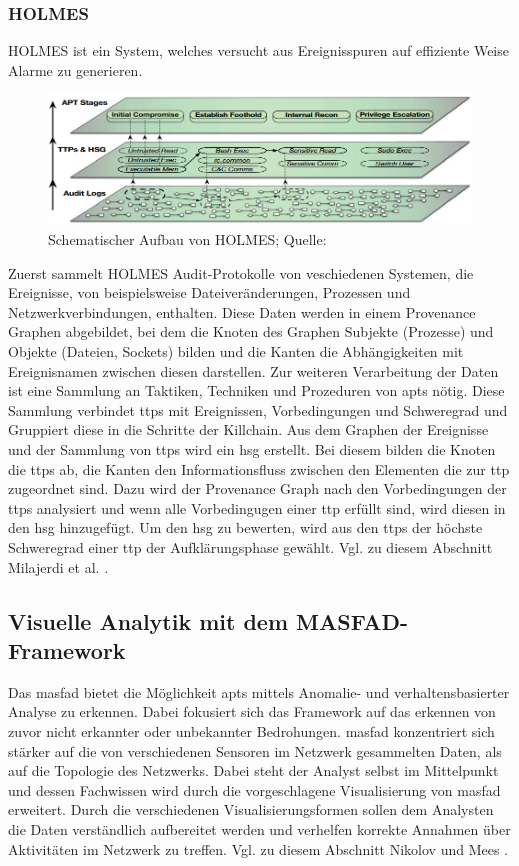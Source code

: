 \documentclass[conference]{IEEEtran}
\begin{document}
\subsubsection{HOLMES}
HOLMES ist ein System, welches versucht aus Ereignisspuren auf effiziente Weise Alarme zu generieren.
\begin{figure}[htbp]
    \centerline{\includegraphics[scale=0.5]{figures/HOLMES.png}}
    \caption{Schematischer Aufbau von HOLMES; Quelle: \cite{Milajerdi2019}}
    \label{fig.holmes}
\end{figure}
Zuerst sammelt HOLMES Audit-Protokolle von veschiedenen Systemen, die Ereignisse, von beispielsweise Dateiveränderungen, Prozessen und Netzwerkverbindungen, enthalten.
Diese Daten werden in einem Provenance Graphen abgebildet, bei dem die Knoten des Graphen Subjekte (Prozesse) und Objekte (Dateien, Sockets) bilden und die Kanten die Abhängigkeiten mit Ereignisnamen zwischen diesen darstellen.
Zur weiteren Verarbeitung der Daten ist eine Sammlung an Taktiken, Techniken und Prozeduren von \acp{apt} nötig.
Diese Sammlung verbindet \acp{ttp} mit Ereignissen, Vorbedingungen und Schweregrad und Gruppiert diese in die Schritte der Killchain.
Aus dem Graphen der Ereignisse und der Sammlung von \acp{ttp} wird ein \ac{hsg} erstellt.
Bei diesem bilden die Knoten die \acp{ttp} ab, die Kanten den Informationsfluss zwischen den Elementen die zur \ac{ttp} zugeordnet sind.
Dazu wird der Provenance Graph nach den Vorbedingungen der \acp{ttp} analysiert und wenn alle Vorbedingugen einer \ac{ttp} erfüllt sind, wird diesen in den \ac{hsg} hinzugefügt.
Um den  \ac{hsg} zu bewerten, wird aus den \acp{ttp} der höchste Schweregrad einer \ac{ttp} der Aufklärungsphase gewählt.
Vgl. zu diesem Abschnitt Milajerdi et al. \cite{Milajerdi2019}.

\subsection{Visuelle Analytik mit dem MASFAD-Framework}
Das \ac{masfad} bietet die Möglichkeit \acp{apt} mittels Anomalie- und verhaltensbasierter Analyse zu erkennen.
Dabei fokusiert sich das Framework auf das erkennen von zuvor nicht erkannter oder unbekannter Bedrohungen.
\ac{masfad} konzentriert sich stärker auf die von verschiedenen Sensoren im Netzwerk gesammelten Daten, als auf die Topologie des Netzwerks.
Dabei steht der Analyst selbst im Mittelpunkt und dessen Fachwissen wird durch die vorgeschlagene Visualisierung von \ac{masfad} erweitert.
Durch die verschiedenen Visualisierungsformen sollen dem Analysten die Daten verständlich aufbereitet werden und verhelfen korrekte Annahmen über Aktivitäten im Netzwerk zu treffen.
Vgl. zu diesem Abschnitt Nikolov und Mees \cite{Nikolov2023}.
\end{document}
